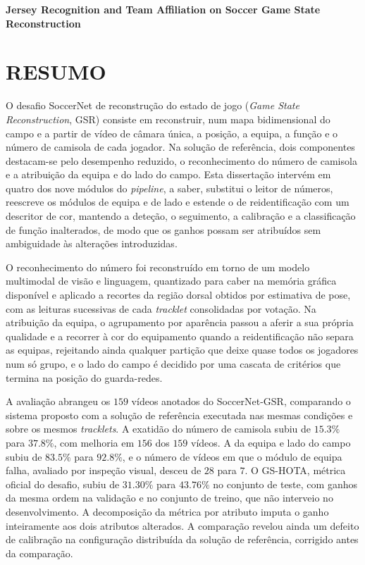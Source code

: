 \begingroup
\begin{flushleft}
\bfseries
{}
{\Large
Jersey Recognition and Team Affiliation on Soccer Game State Reconstruction}

\mdseries
\end{flushleft}
\normalsize
\let\clearpage\relax
\chapter{RESUMO}
\endgroup

\noindent O desafio SoccerNet de reconstrução do estado de jogo (\emph{Game State Reconstruction},
GSR) consiste em reconstruir, num mapa bidimensional do campo e a partir de vídeo de câmara única,
a posição, a equipa, a função e o número de camisola de cada jogador. Na solução de referência, dois
componentes destacam-se pelo desempenho reduzido, o reconhecimento do número de camisola e a
atribuição da equipa e do lado do campo. Esta dissertação intervém em quatro dos nove módulos do
\emph{pipeline}, a saber, substitui o leitor de números, reescreve os módulos de equipa e de lado e estende
o de reidentificação com um descritor de cor, mantendo a deteção, o seguimento, a calibração e a
classificação de função inalterados, de modo que os ganhos possam ser atribuídos sem ambiguidade às
alterações introduzidas.

O reconhecimento do número foi reconstruído em torno de um modelo multimodal de visão e linguagem,
quantizado para caber na memória gráfica disponível e aplicado a recortes da região dorsal obtidos
por estimativa de pose, com as leituras sucessivas de cada \emph{tracklet} consolidadas por votação.
Na atribuição da equipa, o agrupamento por aparência passou a aferir a sua própria qualidade e a
recorrer à cor do equipamento quando a reidentificação não separa as equipas, rejeitando ainda
qualquer partição que deixe quase todos os jogadores num só grupo, e o lado do campo é decidido por
uma cascata de critérios que termina na posição do guarda-redes.

A avaliação abrangeu os $159$ vídeos anotados do SoccerNet-GSR, comparando o sistema proposto com a
solução de referência executada nas mesmas condições e sobre os mesmos \emph{tracklets}. A exatidão
do número de camisola subiu de $15.3\%$ para $37.8\%$, com melhoria em $156$ dos
$159$ vídeos. A da equipa e lado do campo subiu de $83.5\%$ para $92.8\%$, e o número de
vídeos em que o módulo de equipa falha, avaliado por inspeção visual, desceu de $28$
para $7$. O GS-HOTA, métrica oficial do desafio, subiu de $31.30\%$ para
$43.76\%$ no conjunto de teste, com ganhos da mesma ordem na validação e no conjunto de treino,
que não interveio no desenvolvimento. A decomposição da métrica por atributo imputa o ganho
inteiramente aos dois atributos alterados. A comparação revelou ainda um defeito de calibração na
configuração distribuída da solução de referência, corrigido antes da comparação.

